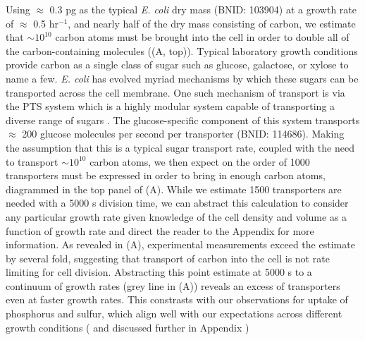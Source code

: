 Using $\approx$ 0.3 pg as the typical \textit{E. coli} dry mass (BNID: 103904)
at a growth rate of $\approx$ 0.5 hr$^{-1}$, and nearly half of the dry mass
consisting of carbon, we estimate that $\sim 10^{10}$ carbon atoms must be
brought into the cell in order to double all of the carbon-containing molecules
((A, top)). Typical laboratory growth conditions provide
carbon as a single class of sugar such as glucose, galactose, or xylose to name
a few. \textit{E. coli} has evolved myriad mechanisms by which these sugars can
be transported across the cell membrane. One such mechanism of transport is via
the PTS system which is a highly modular system capable of transporting a
diverse range of sugars \citep{escalante2012}. The glucose-specific component of
this system transports $\approx$ 200 glucose molecules per second per
transporter (BNID: 114686). Making the assumption that this is a typical sugar
transport rate, coupled with the need to transport $\sim 10^{10}$ carbon atoms,
we then expect on the order of 1000 transporters must be expressed in order to
bring in enough carbon atoms, diagrammed in the top panel of (A).
While we estimate 1500 transporters are needed with a
5000 s division time, we can abstract this calculation to consider any
particular growth rate given knowledge of the cell density and volume as a
function of growth rate and direct the reader to the Appendix
 for more information. As revealed in
(A), experimental measurements exceed the estimate by several
fold, suggesting that transport of carbon into the cell is not rate limiting for
cell division. Abstracting this point estimate at 5000 s to a continuum of
growth rates (grey line in (A)) reveals an excess of
transporters even at faster growth rates. This constrasts with our observations
for uptake of phosphorus and sulfur, which align well with our expectations across
different growth conditions ( and
discussed further in Appendix )

